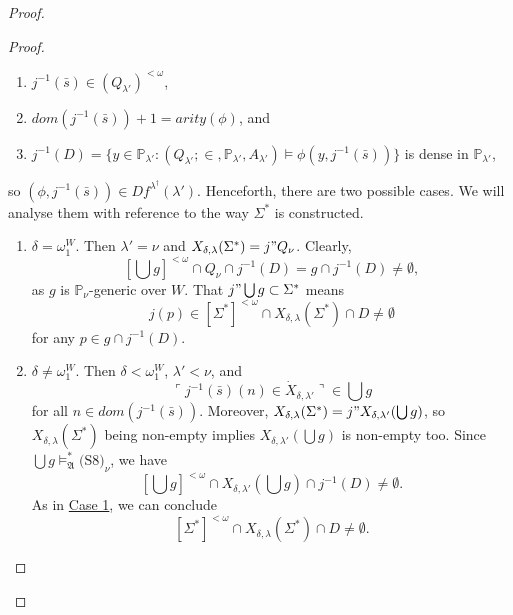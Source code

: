 \documentclass[12pt, twoside]{memoir}
\numberwithin{equation}{section}
\theoremstyle{definition}
\theoremstyle{remark}
\theoremstyle{definition}
\theoremstyle{definition}
\theoremstyle{definition}
\theoremstyle{remark}
\newcommand{\eq}{=}
\begin{document}
\begin{proof}
\begin{proof}
\begin{enumerate}[label=<$k$> $\eq$ \arabic* :, leftmargin=70pt]
\begin{enumerate}[label=(\alph*)]
        \item $j^{-1}(\bar{s}) \in (Q_{\lambda'})^{< \omega}$, 
        \item $dom(j^{-1}(\bar{s})) + 1 = arity(\phi)$, and
        \item $j^{-1}(D) = \{y \in \mathbb{P}_{\lambda'} : (Q_{\lambda'}; \in, \mathbb{P}_{\lambda'}, A_{\lambda'}) \models \phi(y, j^{-1}(\bar{s}))\}$ is dense in $\mathbb{P}_{\lambda'}$,
    \end{enumerate}
    so $(\phi, j^{-1}(\bar{s})) \in Df^{\lambda^{\dagger}}(\lambda')$. Henceforth, there are two possible cases. We will analyse them with reference to the way $\Sigma^*$ is constructed. 
    \begin{enumerate}[label=Case \arabic*:, leftmargin=50pt]
        \item\label{c8c1} $\delta = \omega_1^W$. Then $\lambda' = \nu$ and $X_{\delta, \lambda}(\Sigma^*) = j" Q_{\nu}$. Clearly, $$[\bigcup g]^{< \omega} \cap Q_{\nu} \cap j^{-1}(D) = g \cap j^{-1}(D) \neq \emptyset,$$ as $g$ is $\mathbb{P}_{\nu}$-generic over $W$. That $j" \bigcup g \subset \Sigma^*$ means $$j(p) \in [\Sigma^*]^{< \omega} \cap X_{\delta, \lambda}(\Sigma^*) \cap D \neq \emptyset$$ for any $p \in g \cap j^{-1}(D)$.
        \item $\delta \neq \omega_1^W$. Then $\delta < \omega_1^W$, $\lambda' < \nu$, and $$\ulcorner j^{-1}(\bar{s})(n) \in \dot{X}_{\delta, \lambda'} \urcorner \in \bigcup g$$ for all $n \in dom(j^{-1}(\bar{s}))$. Moreover, $X_{\delta, \lambda}(\Sigma^*) = j" X_{\delta, \lambda'}(\bigcup g)$, so $X_{\delta, \lambda}(\Sigma^*)$ being non-empty implies $X_{\delta, \lambda'}(\bigcup g)$ is non-empty too. Since $\bigcup g \models^*_{\mathfrak{A}} \hyperref[c8]{\text{(S8)}_{\nu}}$, we have $$[\bigcup g]^{< \omega} \cap X_{\delta, \lambda'}(\bigcup g) \cap j^{-1}(D) \neq \emptyset.$$ As in \hyperref[c8c1]{Case 1}, we can conclude $$[\Sigma^*]^{< \omega} \cap X_{\delta, \lambda}(\Sigma^*) \cap D \neq \emptyset.$$
    \end{enumerate}
\end{enumerate}


\end{proof}
\end{proof}
\end{document}
